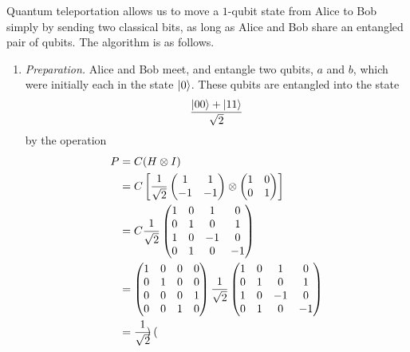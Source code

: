 \documentclass[12pt]{amsart}
\begin{document}
{

Quantum teleportation allows us to move a $1$-qubit state from Alice to Bob
simply by sending two classical bits, as long as Alice and Bob share an
entangled pair of qubits.  The algorithm is as follows.

\begin{enumerate}
  \item \emph{Preparation.}  Alice and Bob meet, and entangle two qubits, $a$
    and $b$, which were initially each in the state ${\left\vert{0}\right\rangle}$.  These qubits
    are entangled into the state \[ \frac{{\left\vert{00}\right\rangle} + {\left\vert{11}\right\rangle}}{\sqrt{2}} \] by
    the operation
    \begin{align*}
      P
      &= C(H \otimes I) \\
      &= C
         \left[ \frac{1}{\sqrt{2}}
                \begin{pmatrix} 1 & 1 \\ -1 & -1 \end{pmatrix}
                \otimes
                \begin{pmatrix} 1 & 0 \\  0 &  1 \end{pmatrix} \right] \\
      &= C
         \frac{1}{\sqrt{2}}
         \begin{pmatrix}
           1 & 0 &  1 &  0 \\
           0 & 1 &  0 &  1 \\
           1 & 0 & -1 &  0 \\
           0 & 1 &  0 & -1
         \end{pmatrix} \\
      &= \begin{pmatrix}
           1 & 0 & 0 & 0 \\
           0 & 1 & 0 & 0 \\
           0 & 0 & 0 & 1 \\
           0 & 0 & 1 & 0
         \end{pmatrix}
         \frac{1}{\sqrt{2}}
         \begin{pmatrix}
           1 & 0 &  1 &  0 \\
           0 & 1 &  0 &  1 \\
           1 & 0 & -1 &  0 \\
           0 & 1 &  0 & -1
         \end{pmatrix} \\
      &= \frac{1}{\sqrt{2}}
         \begin{pmatrix}

\end{pmatrix}
\end{align*}
\end{enumerate}}
\end{document}
